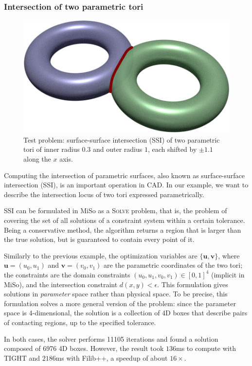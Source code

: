 \subsubsection{Intersection of two parametric tori}
\begin{figure}
	\centering
	\includegraphics[width=0.8\linewidth]{fig/torusInt.png}
	\caption{Test problem: surface-surface intersection (SSI) of two parametric tori of inner radius $0.3$ and outer radius $1$, each shifted by $\pm1.1$ along the $x$ axis.}
	\label{fig:tori}
\end{figure}
Computing the intersection of parametric surfaces, also known as surface-surface intersection (SSI), is an important operation in CAD.
In our example, we want to describe the intersection locus of two tori expressed parametrically.

SSI can be formulated in MiSo as a \textsc{Solve} problem, that is, the problem of covering the set of all solutions of a constraint system within a certain tolerance.
Being a conservative method, the algorithm returns a region that is larger than the true solution, but is guaranteed to contain every point of it.

Similarly to the previous example, the optimization variables are $\{\mathbf{u}, \mathbf{v}\}$, where $\mathbf{u}=(u_0, u_1)$ and $\mathbf{v}=(v_0, v_1)$ are the parametric coordinates of the two tori;
the constraints are the domain constraints $(u_0,u_1,v_0,v_1)\in[0,1]^4$ (implicit in MiSo), and the intersection constraint $d(x,y)<\epsilon$.
This formulation gives solutions in \emph{parameter} space rather than physical space. To be precise, this formulation solves a more general version of the problem: since the parameter space is 4-dimensional, the solution is a collection of 4D boxes that describe pairs of contacting regions, up to the specified tolerance.

In both cases, the solver performs 11105 iterations and found a solution composed of 6976 4D boxes. However, the result took $136$ms to compute with TIGHT and $2186$ms with Filib++, a speedup of about $16\times$.

